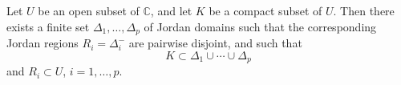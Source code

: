 Let $U$ be an open subset of $\mathbb{C}$, and let $K$ be a compact subset of $U$. Then there exists a finite set $\Delta_1, \ldots, \Delta_p$ of Jordan domains such that the corresponding Jordan regions $R_i = \Delta_i^-$ are pairwise disjoint, and such that
$$K \subset \Delta_1 \cup \cdots \cup \Delta_p$$
and $R_i \subset U$, $i = 1, \ldots, p$.
